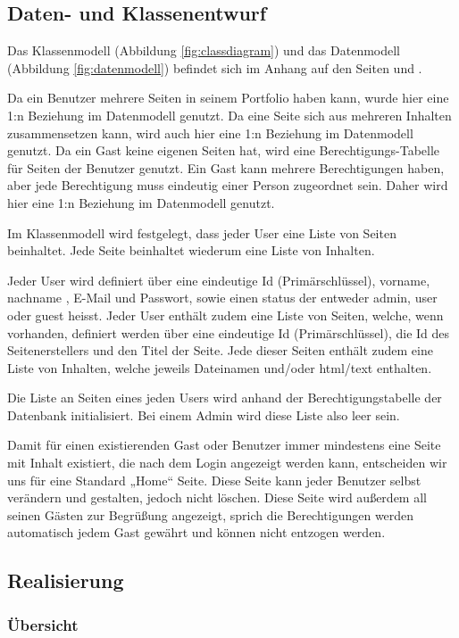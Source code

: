 \documentclass[10pt]{article}
\begin{document}
\subsection{Daten- und Klassenentwurf}

Das Klassenmodell (Abbildung \ref{fig:classdiagram}) und das Datenmodell (Abbildung \ref{fig:datenmodell}) befindet sich im Anhang auf den Seiten \pageref{fig:classdiagram} und \pageref{fig:datenmodell}.

Da ein Benutzer mehrere Seiten in seinem Portfolio haben kann, wurde hier eine 1:n Beziehung im Datenmodell genutzt.
Da eine Seite sich aus mehreren Inhalten zusammensetzen kann, wird auch hier eine 1:n Beziehung im Datenmodell genutzt. 
Da ein Gast keine eigenen Seiten hat, wird eine Berechtigungs-Tabelle für Seiten der Benutzer genutzt. Ein Gast kann mehrere Berechtigungen haben, aber jede Berechtigung muss eindeutig einer Person zugeordnet sein. Daher wird hier eine 1:n Beziehung im Datenmodell genutzt.

Im Klassenmodell wird festgelegt, dass jeder User eine Liste von Seiten beinhaltet.
Jede Seite beinhaltet wiederum eine Liste von Inhalten.

Jeder User wird definiert über eine eindeutige Id (Primärschlüssel), vorname, nachname , E-Mail und Passwort, sowie einen status der entweder admin, user oder guest heisst.
Jeder User enthält zudem eine Liste von Seiten, welche, wenn vorhanden, definiert werden über eine eindeutige Id (Primärschlüssel), die Id des Seitenerstellers und den Titel der Seite.
Jede dieser Seiten enthält zudem eine Liste von Inhalten, welche jeweils Dateinamen und/oder html/text enthalten.

Die Liste an Seiten eines jeden Users wird anhand der Berechtigungstabelle der Datenbank initialisiert. Bei einem Admin wird diese Liste also leer sein.

Damit für einen existierenden Gast oder Benutzer immer mindestens eine Seite mit Inhalt existiert, die nach dem Login angezeigt werden kann, entscheiden wir uns für eine Standard „Home“ Seite.
Diese Seite kann jeder Benutzer selbst verändern und gestalten, jedoch nicht löschen. Diese Seite wird außerdem all seinen Gästen zur Begrüßung angezeigt, sprich die Berechtigungen werden automatisch jedem Gast gewährt und können nicht entzogen werden.

\subsection{Realisierung}
\subsubsection{Übersicht}
\end{document}
